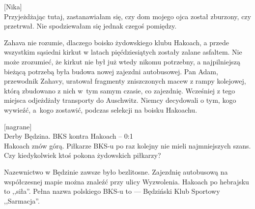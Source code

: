 \documentclass[11pt,a4paper,oneside]{article}
\begin{document}
[Nika]\\
Przyjeżdżając tutaj, zastanawiałam się, czy dom mojego ojca został zburzony,
czy przetrwał. Nie spodziewałam się jednak czegoś pomiędzy.

Zahava nie rozumie, dlaczego boisko żydowskiego klubu Hakoach, a przede
wszystkim sąsiedni kirkut w latach pięćdziesiątych zostały zalane asfaltem. Nie
może zrozumieć, że kirkut nie był już wtedy nikomu potrzebny, a najpilniejszą
bieżącą potrzebą była budowa nowej zajezdni autobusowej. Pan Adam, przewodnik
Zahavy, uratował fragmenty zniszczonych macew z rampy kolejowej, którą
zbudowano z nich w~tym samym czasie, co zajezdnię. Wcześniej z tego miejsca
odjeżdżały transporty do Auschwitz. Niemcy decydowali o tym, kogo wywieźć,
a~kogo zostawić, podczas selekcji na boisku Hakoachu.

[\textmd{nagrane}]\\
Derby Będzina. BKS kontra Hakoach -- 0:1\\
Hakoach znów górą. Piłkarze BKS-u po raz kolejny nie mieli najmniejszych szans.
Czy kiedykolwiek ktoś pokona żydowskich piłkarzy?

Nazewnictwo w Będzinie zawsze było bezlitosne. Zajezdnię autobusową na
współczesnej mapie można znaleźć przy ulicy Wyzwolenia. Hakoach po hebrajsku to
,,siła''. Pełna nazwa polskiego BKS-u to --- Będziński Klub Sportowy
,,Sarmacja''. 
\end{document}
